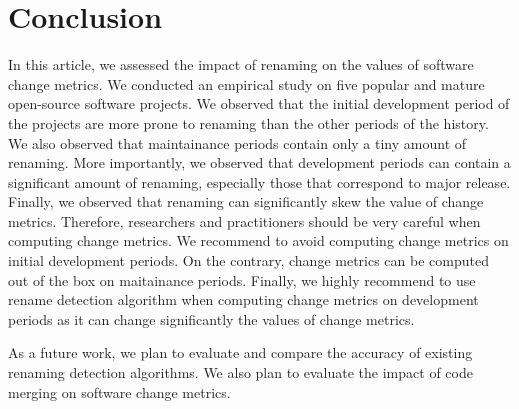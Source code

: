 \section{Conclusion}
\label{sec:conclusion}

In this article, we assessed the impact of renaming on the values of software change metrics. We conducted an empirical study on five popular and mature open-source software projects. We observed that the initial development period of the projects are more prone to renaming than the other periods of the history. We also observed that maintainance periods contain only a tiny amount of renaming. More importantly, we observed that development periods can contain a significant amount of renaming, especially those that correspond to major release. Finally, we observed that renaming can significantly skew the value of change metrics. Therefore, researchers and practitioners should be very careful when computing change metrics. We recommend to avoid computing change metrics on initial development periods. On the contrary, change metrics can be computed out of the box on maitainance periods. Finally, we highly recommend to use rename detection algorithm when computing change metrics on development periods as it can change significantly the values of change metrics.

As a future work, we plan to evaluate and compare the accuracy of existing renaming detection algorithms. We also plan to evaluate the impact of code merging on software change metrics.

